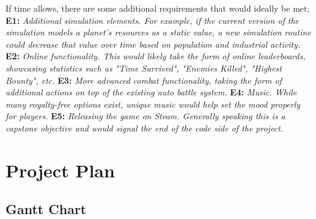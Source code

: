 \documentclass{report}
\newcommand{\req}[2]{\textbf{		#1:  }	\textit{#2}\newline\newline}
\begin{document}
If time allows, there are some additional requirements that would ideally be met;
\newline
\newline
\req{E1}{Additional simulation elements. For example, if the current version of the simulation models a planet's resources as a static value, a new simulation routine could decrease that value over time based on population and industrial activity.}
\req{E2}{Online functionality. This would likely take the form of online leaderboards, showcasing statistics such as "Time Survived", "Enemies Killed", "Highest Bounty", etc.}
\req{E3}{More advanced combat functionality, taking the form of additional actions on top of the existing auto battle system. }
\req{E4}{Music. While many royalty-free options exist, unique music would help set the mood properly for players.}
\req{E5}{Releasing the game on Steam. Generally speaking this is a capstone objective and would signal the end of the code side of the project. }

\chapter{Project Plan}

\section{Gantt Chart}
\end{document}
